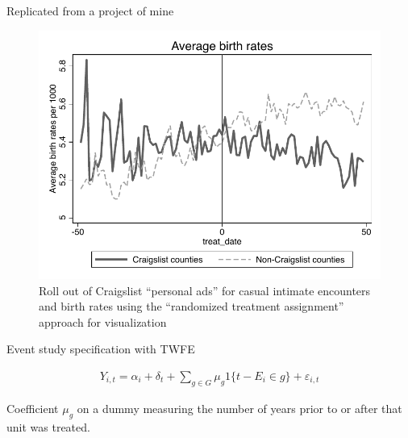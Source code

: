 \documentclass{beamer}
\begin{document}
\begin{frame}{Replicated from a project of mine}

	\begin{figure}
	\includegraphics[scale=0.5]{./lecture_includes/dd.pdf}
	\caption{Roll out of Craigslist ``personal ads'' for casual intimate encounters and birth rates using the ``randomized treatment assignment'' approach for visualization}
	\end{figure}

\end{frame}

\begin{frame}{Event study specification with TWFE}


\begin{eqnarray*}
Y_{i,t} = \alpha_i + \delta_t + \sum_{g \in G} \mu_g1\{t-E_i \in g \} + \varepsilon_{i,t}
\end{eqnarray*}

\bigskip

Coefficient $\mu_g$ on a dummy measuring the number of years prior to or after that unit was treated.  

\end{frame}
\end{document}
